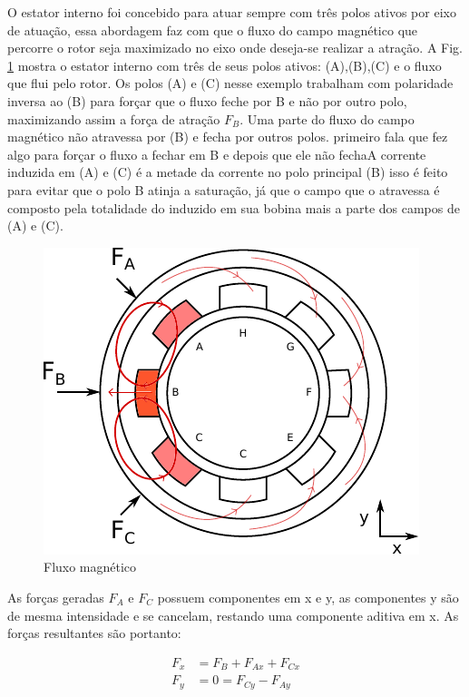 O estator interno foi concebido para atuar sempre com três polos ativos por eixo de atuação, essa abordagem faz com que o fluxo do campo magnético que percorre o rotor seja maximizado no eixo onde deseja-se realizar a atração. A Fig. \ref{fig:modelo:mancal:estator:interno:fluxo} mostra o estator interno com três de seus polos ativos: (A),(B),(C) e o fluxo que flui pelo rotor. Os polos (A) e (C) nesse exemplo trabalham com polaridade inversa ao (B) para forçar que o fluxo feche por B e não por outro polo, maximizando assim a força de atração $F_B$.  Uma parte do fluxo do campo magnético não atravessa por (B) e fecha por outros polos. {primeiro fala que fez algo para forçar o fluxo a fechar em B e depois que ele não fecha}A corrente induzida em (A) e (C) é a metade da corrente no polo principal (B) isso é feito para evitar que o polo B atinja a saturação, já que o campo que o atravessa é composto pela totalidade do induzido em sua bobina mais a parte dos campos de (A) e (C).

\begin{figure}[ht!]
	\centering
	\includegraphics[width=0.7\linewidth]{./Figs/modelo_mancal_estator_interno_fluxo}
	\caption{Fluxo magnético}
	\label{fig:modelo:mancal:estator:interno:fluxo}
\end{figure}

As forças geradas $F_A$ e $F_C$ possuem componentes em x e y, as componentes y são de mesma intensidade e se cancelam, restando uma componente aditiva em x. As forças resultantes são portanto:

\begin{align}
 	F_x &= F_B + F_{Ax} + F_{Cx} \\
 	F_y &= 0 = F_{Cy} - F_{Ay} 
\end{align}


